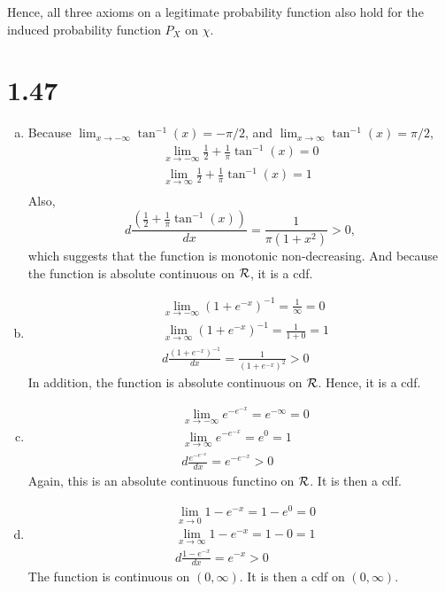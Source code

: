\documentclass[letterpaper]{article}
\begin{document}
    Hence, all three axioms on a legitimate probability function also hold for
    the induced probability function $P_X$ on $\chi$.
    \section*{1.47}
    \begin{enumerate}[(a)]
        \item Because $\lim_{x \to -\infty} \tan^{-1}(x) = -\pi /2$, and $\lim_{x \to \infty} \tan^{-1}(x) = \pi/2$,
        \begin{multline*}
            \lim_{x \to -\infty} \frac{1}{2} + \frac{1}{\pi} \tan^{-1}(x) = 0\\
            \lim_{x \to \infty} \frac{1}{2} + \frac{1}{\pi} \tan^{-1}(x) = 1\\
        \end{multline*}
        Also,
        \[
        d \frac{(\frac{1}{2}+\frac{1}{\pi} \tan^{-1}(x))}{dx} = \frac{1}{\pi(1+x^2)} > 0,
        \]
        which suggests that the function is monotonic non-decreasing. 
        And because the function is absolute continuous on $\cal R$, it is a cdf.
        \item 
        \begin{align*}
        & \lim_{x \to -\infty} (1+e^{-x})^{-1} = \frac{1}{\infty} = 0 \\
        & \lim_{x \to \infty} (1+e^{-x})^{-1} = \frac{1}{1+0} = 1 \\
        & d \frac{(1+e^{-x})^{-1}}{dx} = \frac{1}{(1+e^{-x})^2} > 0
        \end{align*}
        In addition, the function is absolute continuous on $\cal R$. Hence, it is a cdf.

        \item 
        \begin{align*}
        & \lim_{x \to -\infty} e^{-e^{-x}} = e^{-\infty} = 0 \\
        & \lim_{x \to \infty} e^{-e^{-x}} = e^0 = 1 \\
        & d \frac{e^{-e^{-x}}}{dx} = e^{-e^{-x}} > 0
        \end{align*}
        Again, this is an absolute continuous functino on $\cal R$. It is then a cdf.

        \item 
        \begin{align*}
        & \lim_{x \to 0} 1-e^{-x} = 1-e^0 = 0 \\
        & \lim_{x \to \infty} 1- e^{-x} = 1 - 0 = 1 \\
        & d \frac{1-e^{-x}}{dx} = e^{-x} > 0
        \end{align*}
        The function is continuous on $(0, \infty)$. It is then a cdf on $(0, \infty)$.


\end{enumerate}
\end{document}
